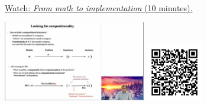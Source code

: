 
\begin{minipage}{10cm}
    \href{https://act4e-spring21.netlify.app/videos/spring2021-functorial-comp-a:from-math-to-impl.html}{Watch: \emph{From math to implementation} (10 minutes).}
        
    \href{https://act4e-spring21.netlify.app/videos/spring2021-functorial-comp-a:from-math-to-impl.html}{\includegraphics[height=3.5cm]{spring2021-functorial-comp-a:from-math-to-impl/thumbnails.jpg}}
    \href{https://act4e-spring21.netlify.app/videos/spring2021-functorial-comp-a:from-math-to-impl.html}{\includegraphics[height=2.5cm]{spring2021-functorial-comp-a:from-math-to-impl/qrcode.png}}
\end{minipage}
